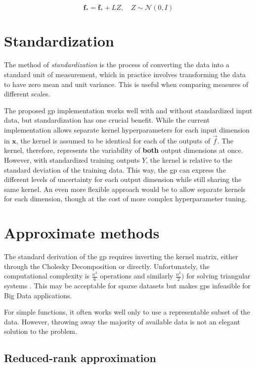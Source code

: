 \begin{equation}
    \boldsymbol{f}_* = \bar{\boldsymbol{f}}_* + L Z, \quad Z \sim \mathcal{N}(0, I)
\end{equation}

\section{Standardization}
The method of \textit{standardization} is the process of converting the data into a standard unit of measurement, which in practice involves transforming the data to have zero mean and unit variance. This is useful when comparing measures of different scales.

The proposed \acrshort{gp} implementation works well with and without standardized input data, but standardization has one crucial benefit. While the current implementation allows separate kernel hyperparameters for each input dimension in $\boldsymbol{x}$, the kernel is assumed to be identical for each of the outputs of $\vec{f}$. The kernel, therefore, represents the variability of \textbf{both} output dimensions at once. However, with standardized training outputs $Y$, the kernel is relative to the standard deviation of the training data. This way, the \acrshort{gp} can express the different levels of uncertainty for each output dimension while still sharing the same kernel. An even more flexible approach would be to allow separate kernels for each dimension, though at the cost of more complex hyperparameter tuning.

\section{Approximate methods}
The standard derivation of the \acrshort{gp} requires inverting the kernel matrix, either through the Cholesky Decomposition or directly. Unfortunately, the computational complexity is $\frac{n^3}{6}$ operations and similarly $\frac{n^2}{2})$ for solving triangular systems \cite{rasmussen}. This may be acceptable for sparse datasets but makes \acrshort{gp}s infeasible for Big Data applications. 

For simple functions, it often works well only to use a representable subset of the data. However, throwing away the majority of available data is not an elegant solution to the problem. 

\subsection{Reduced-rank approximation}

